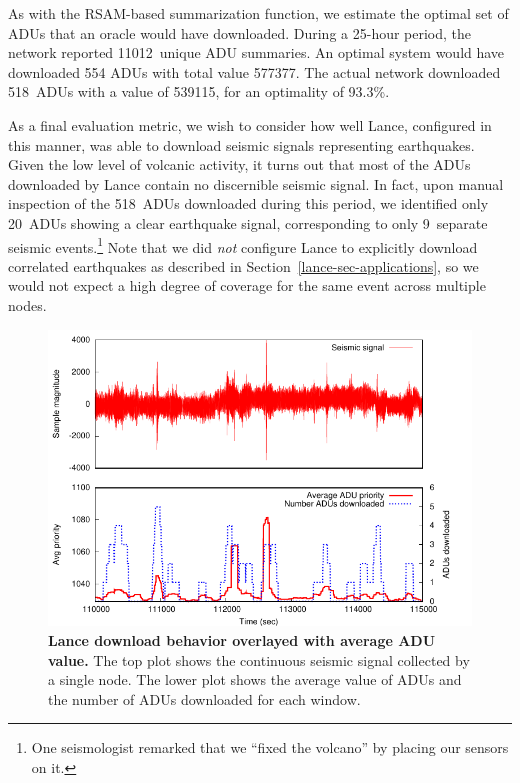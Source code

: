 
As with the RSAM-based summarization function, we estimate the optimal set of
ADUs that an oracle would have downloaded. During a 25-hour period, the
network reported 11012~unique ADU summaries. An optimal system would have
downloaded 554 ADUs with total value 577377.  The actual network
downloaded 518~ADUs with a value of 539115, for an optimality of 93.3\%. 


As a final evaluation metric, we wish to consider how well Lance,
configured in this manner, was able to download seismic signals
representing earthquakes. Given the low level of volcanic activity, 
it turns out that most of the ADUs downloaded by Lance contain no 
discernible seismic signal. In fact, upon manual inspection of the
518~ADUs downloaded during this period, we identified only 20~ADUs
showing a clear earthquake signal, corresponding to only 9~separate
seismic events.\footnote{One seismologist remarked that we 
``fixed the volcano'' by placing our sensors on it.}
Note that we did {\em not} configure Lance to explicitly download 
correlated earthquakes as described in Section~\ref{lance-sec-applications},
so we would not expect a high degree of coverage for the same event
across multiple nodes.

\begin{figure}[t]
\label{lance-fig-downloads-cont}
\begin{center}
\includegraphics[width=1.0\hsize]{./4-lance/figs/deploy/deploydownloads/everything.pdf}
\end{center}
\caption{\textbf{Lance download behavior overlayed with average ADU value.}
The top plot shows the continuous seismic signal collected by a single node.
The lower plot shows the average value of ADUs and the number of ADUs
downloaded for each window.}
\end{figure}

